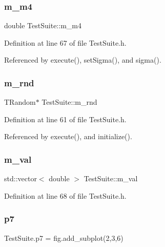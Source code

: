 \subsubsection{\texorpdfstring{m\+\_\+m4}{m\_m4}}
{\footnotesize\ttfamily double Test\+Suite\+::m\+\_\+m4\hspace{0.3cm}{\ttfamily [private]}}



Definition at line 67 of file Test\+Suite.\+h.



Referenced by execute(), set\+Sigma(), and sigma().

\mbox{\label{classTestSuite_a8288c9104c87bfc3934e2b6bffdef66f}} 
\subsubsection{\texorpdfstring{m\+\_\+rnd}{m\_rnd}}
{\footnotesize\ttfamily T\+Random$\ast$ Test\+Suite\+::m\+\_\+rnd\hspace{0.3cm}{\ttfamily [private]}}



Definition at line 61 of file Test\+Suite.\+h.



Referenced by execute(), and initialize().

\mbox{\label{classTestSuite_affc1803c853fb7633bc59aa89d217fcf}} 
\subsubsection{\texorpdfstring{m\+\_\+val}{m\_val}}
{\footnotesize\ttfamily std\+::vector$<$ double $>$ Test\+Suite\+::m\+\_\+val\hspace{0.3cm}{\ttfamily [private]}}



Definition at line 68 of file Test\+Suite.\+h.

\mbox{\label{classTestSuite_a33f823770703efeb508f2736f4ef4e1b}} 
\subsubsection{\texorpdfstring{p7}{p7}}
{\footnotesize\ttfamily Test\+Suite.\+p7 = fig.\+add\+\_\+subplot(2,3,6)}



